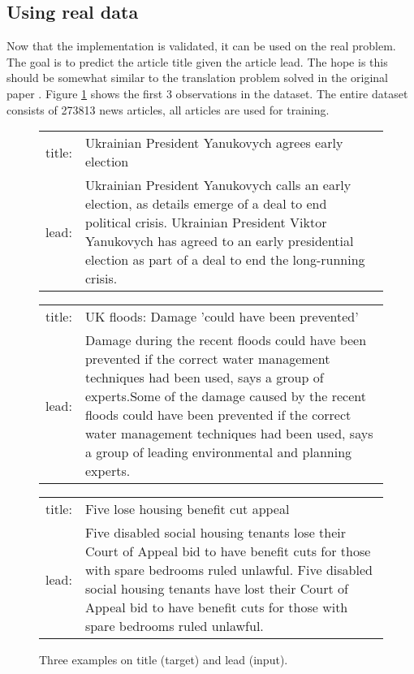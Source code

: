 \subsection{Using real data}

Now that the implementation is validated, it can be used on the real problem. The goal is to predict the article title given the article lead. The hope is this should be somewhat similar to the translation problem solved in the original paper \cite{sutskever}. Figure \ref{fig:results:sutskever:example} shows the first 3 observations in the dataset. The entire dataset consists of 273813 news articles, all articles are used for training.

\begin{figure}[H]
\centering
\begin{tabular}{r|p{10cm}}
	title: & Ukrainian President Yanukovych agrees early election \\
	lead: & Ukrainian President Yanukovych calls an early election, as details emerge of a deal to end political crisis. Ukrainian President Viktor Yanukovych has agreed to an early presidential election as part of a deal to end the long-running crisis.
\end{tabular}
\mbox{}\vspace*{0.5cm}
\begin{tabular}{r|p{10cm}}
	title: & UK floods: Damage 'could have been prevented' \\
	lead: & Damage during the recent floods could have been prevented if the correct water management techniques had been used, says a group of experts.Some of the damage caused by the recent floods could have been prevented if the correct water management techniques had been used, says a group of leading environmental and planning experts.
\end{tabular}
\mbox{}\vspace*{0.5cm}
\begin{tabular}{r|p{10cm}}
	title: & Five lose housing benefit cut appeal \\
	lead: & Five disabled social housing tenants lose their Court of Appeal bid to have benefit cuts for those with spare bedrooms ruled unlawful. Five disabled social housing tenants have lost their Court of Appeal bid to have benefit cuts for those with spare bedrooms ruled unlawful.
\end{tabular}
\caption{Three examples on title (target) and lead (input).}
\label{fig:results:sutskever:example}
\end{figure}

